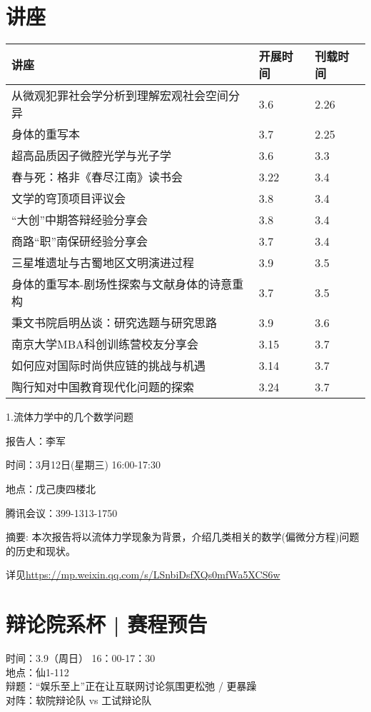 \documentclass[letterpaper, 12pt]{article}
\begin{document}
\begin{multicols}{2}

\section{讲座}
\begin{tabular}{|>{\centering\arraybackslash}m{}|m{}|m{}|}
    \hline
    讲座 & 开展时间 & 刊载时间\\
    \hline\hline
    从微观犯罪社会学分析到理解宏观社会空间分异   &3.6  &2.26 \\\hline
    身体的重写本 & 3.7 & 2.25\\\hline
    超高品质因子微腔光学与光子学 & 3.6 & 3.3\\\hline
    春与死：格非《春尽江南》读书会 & 3.22 & 3.4\\\hline
    文学的穹顶项目评议会 & 3.8 & 3.4\\\hline
    “大创”中期答辩经验分享会 & 3.8 & 3.4\\\hline
    商路“职”南保研经验分享会 & 3.7 & 3.4\\\hline
    三星堆遗址与古蜀地区文明演进过程 & 3.9 & 3.5\\\hline
    身体的重写本-剧场性探索与文献身体的诗意重构 & 3.7 & 3.5\\\hline
    秉文书院启明丛谈：研究选题与研究思路 & 3.9 & 3.6\\\hline
    南京大学MBA科创训练营校友分享会 & 3.15 & 3.7\\\hline
    如何应对国际时尚供应链的挑战与机遇 & 3.14 & 3.7\\\hline
    陶行知对中国教育现代化问题的探索 & 3.24 & 3.7\\\hline

\end{tabular}
1.流体力学中的几个数学问题

报告人：李军

时间：3月12日(星期三) 16:00-17:30

地点：戊己庚四楼北

腾讯会议：399-1313-1750

摘要: 本次报告将以流体力学现象为背景，介绍几类相关的数学(偏微分方程)问题的历史和现状。

详见\url{https://mp.weixin.qq.com/s/LSnbiDsfXQs0mfWa5XCS6w}

\section{辩论院系杯 | 赛程预告}
时间：3.9（周日） 16：00-17：30\\
地点：仙1-112\\
辩题：“娱乐至上”正在让互联网讨论氛围更松弛 / 更暴躁\\
对阵：软院辩论队 vs 工试辩论队\\


\end{multicols}
\end{document}
